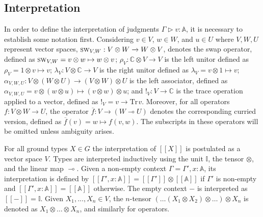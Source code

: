 \subsection{Interpretation}
In order to define the interpretation of judgments $\Gamma \triangleright v: \mathbb{A}$, it is necessary to establish some notation first. Considering $v \in V$, $w \in W$, and $u \in U$  where $V, W, U$ represent vector spaces,  $\textsc{sw}_{V,W} : V\otimes W \xrightarrow{} W \otimes V$, denotes the swap operator, defined as $\textsc{sw}_{V,W}= v\otimes w \mapsto w \otimes v$;    $\rho_{V} : \mathbb{C} \otimes V \xrightarrow{} V $ is the left unitor defined as $\rho_{V}= 1 \otimes v \mapsto v $; $\lambda_{V} : V  \otimes \mathbb{C} \xrightarrow{} V $ is the right unitor defined as $\lambda_{V}= v \otimes 1 \mapsto v$; $\alpha_{V,W,U} : V  \otimes (W \otimes U) \xrightarrow{} (V  \otimes W) \otimes U$ is the left associator, defined as $\alpha_{V,W,U}= v \otimes (w \otimes u) \mapsto (v \otimes w) \otimes u $; and $!_{V}: V \xrightarrow{} \mathbb{C}$ is the trace operation applied to a vector, defined as  $!_{V}= v \xrightarrow{} \text{Tr} \hspace{1pt}v$. Moreover, for all operators $f: V \otimes W \xrightarrow{} U$, the operator $\overline{f} : V \xrightarrow{} (W \multimap U)$ denotes the corresponding curried version, defined as $\overline{f}(v) = w \mapsto  f(v,w)$. The subscripts in these operators will be omitted unless ambiguity arises.

For all ground types $X \in G$  the interpretation of $[\![X]\!]$  is postulated as a vector space $V$. Types are interpreted inductively using the unit $\mathbb{I}$, the tensor $\otimes$, and the linear map $\multimap$. Given a non-empty context $\Gamma=\Gamma',x: \mathbb{A}$, its interpretation is defined by $[\![\Gamma',x: \mathbb{A}]\!] = [\![\Gamma']\!] \otimes [\![\mathbb{A}]\!]$ if $\Gamma'$ is non-empty and $[\![\Gamma',x: \mathbb{A}]\!] = [\![\mathbb{A}]\!]$ otherwise. The empty context $-$ is interpreted as $[\![-]\!] = \mathbb{I}$. Given $X_{1}, . . . ,X_{n} \in V$, the $n$-tensor $(\ldots (X_1 \otimes X_2) \otimes \ldots ) \otimes X_{n}$ is denoted as $X_1 \otimes \ldots \otimes X_{n}$, and similarly for operators. 


